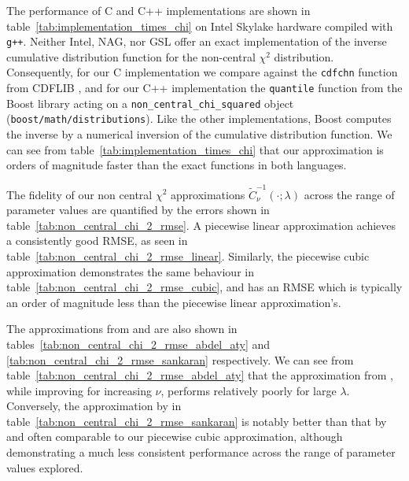 \documentclass[manuscript,review]{acmart}
\begin{document}
The performance of C and C++ implementations are shown in table~\ref{tab:implementation_times_chi} on Intel Skylake hardware compiled with \texttt{g++}. Neither Intel, NAG, nor GSL offer an exact implementation of the inverse cumulative distribution function for the non-central $ \chi^2 $ distribution. Consequently, for our C implementation we compare against the \texttt{cdfchn} function from CDFLIB \citep{brown1994dcdflib,burkardt2020cdflib}, and for our C++ implementation the \texttt{quantile} function from the Boost library \citep{boost2020library} acting on a \texttt{non\_central\_chi\_squared} object (\texttt{boost/math/distributions}). Like the other implementations, Boost computes the inverse by a numerical inversion of the cumulative distribution function. We can see from table~\ref{tab:implementation_times_chi} that our approximation is orders of magnitude faster than the exact functions in both languages. 


The fidelity of our non central $\chi^2$ approximations $ \widetilde{C}^{-1}_{\nu}(\cdot;\lambda) $ across the range of parameter values are quantified by the errors shown in table~\ref{tab:non_central_chi_2_rmse}. A piecewise linear approximation achieves a consistently good RMSE, as seen in table~\ref{tab:non_central_chi_2_rmse_linear}. Similarly, the piecewise cubic approximation demonstrates the same behaviour in table~\ref{tab:non_central_chi_2_rmse_cubic}, and has an RMSE which is typically an order of magnitude less than the piecewise linear approximation's. 

The approximations from \citet{abdel1954approximate} and \citet{sankaran1959non} are also shown in tables~\ref{tab:non_central_chi_2_rmse_abdel_aty} and \ref{tab:non_central_chi_2_rmse_sankaran} respectively. We can see from table~\ref{tab:non_central_chi_2_rmse_abdel_aty} that the approximation from \citeauthor{abdel1954approximate}, while improving for increasing $ \nu $, performs relatively poorly for large $ \lambda $. Conversely, the approximation by \citeauthor{sankaran1959non} in table~\ref{tab:non_central_chi_2_rmse_sankaran} is notably better than that by \citeauthor{abdel1954approximate} and often comparable to our piecewise cubic approximation, although demonstrating a much less consistent performance across the range of parameter values explored. 
\end{document}
